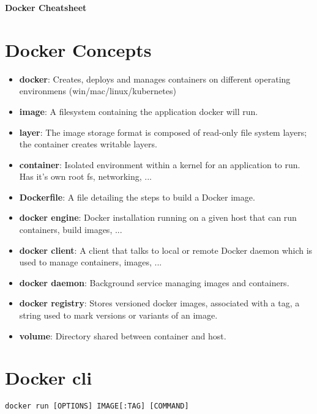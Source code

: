 \documentclass[a4paper,landscape]{article}
\begin{document}
\begin{center}
    \LARGE\textbf{Docker Cheatsheet}
\end{center}

\begin{multicols}{3}

\section*{Docker Concepts}
\begin{itemize}
    \item \textbf{docker}: Creates, deploys and manages containers on different operating environmens (win/mac/linux/kubernetes)
    \item \textbf{image}: A filesystem containing the application docker will run.
    \item \textbf{layer}: The image storage format is composed of read-only file system layers; the container creates writable layers.
    \item \textbf{container}: Isolated environment within a kernel for an application to run. Has it's own root fs, networking, ...
    \item \textbf{Dockerfile}: A file detailing the steps to build a Docker image.
    \item \textbf{docker engine}: Docker installation running on a given host that can run containers, build images, ...
    \item \textbf{docker client}: A client that talks to local or remote Docker daemon which is used to manage containers, images, ...
    \item \textbf{docker daemon}: Background service managing images and containers.
    \item \textbf{docker registry}: Stores versioned docker images, associated with a tag, a string used to mark versions or variants of an image.
    \item \textbf{volume}: Directory shared between container and host.
\end{itemize}

\columnbreak

\section*{Docker cli}
\begin{verbatim}
docker run [OPTIONS] IMAGE[:TAG] [COMMAND]
\end{verbatim}


\end{multicols}
\end{document}
